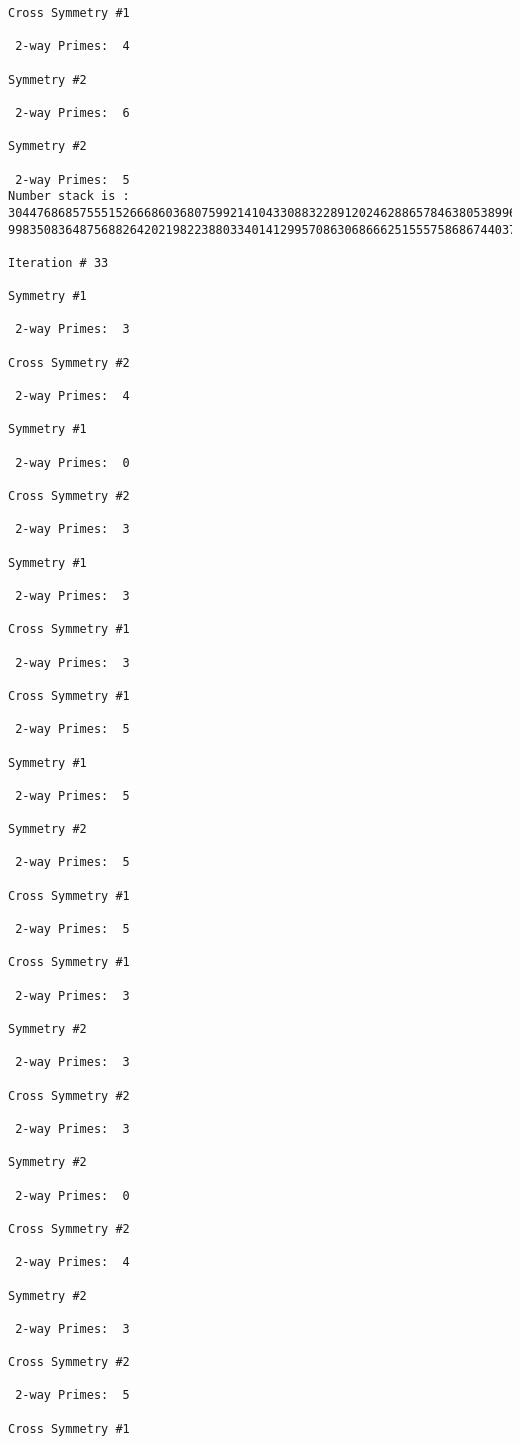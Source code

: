 \begin{verbatim}
Cross Symmetry #1

 2-way Primes: 	4

Symmetry #2

 2-way Primes: 	6

Symmetry #2

 2-way Primes: 	5
Number stack is :
30447686857555152666860368075992141043308832289120246288657846380538996794608835958544046240163340857
99835083648756882642021982238803340141299570863068666251555758686744037580433610426404458595388064976

Iteration #	33

Symmetry #1

 2-way Primes: 	3

Cross Symmetry #2

 2-way Primes: 	4

Symmetry #1

 2-way Primes: 	0

Cross Symmetry #2

 2-way Primes: 	3

Symmetry #1

 2-way Primes: 	3

Cross Symmetry #1

 2-way Primes: 	3

Cross Symmetry #1

 2-way Primes: 	5

Symmetry #1

 2-way Primes: 	5

Symmetry #2

 2-way Primes: 	5

Cross Symmetry #1

 2-way Primes: 	5

Cross Symmetry #1

 2-way Primes: 	3

Symmetry #2

 2-way Primes: 	3

Cross Symmetry #2

 2-way Primes: 	3

Symmetry #2

 2-way Primes: 	0

Cross Symmetry #2

 2-way Primes: 	4

Symmetry #2

 2-way Primes: 	3

Cross Symmetry #2

 2-way Primes: 	5

Cross Symmetry #1


\end{verbatim}
